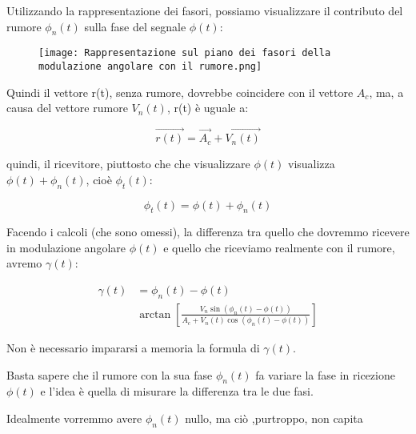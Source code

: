 \newpage 

Utilizzando la rappresentazione dei fasori, 
possiamo visualizzare il contributo del rumore $\phi_n (t)$ sulla fase del segnale $\phi (t)$: 

\begin{figure}[h]
    \centering
    \texttt{[image: Rappresentazione sul piano dei fasori della modulazione angolare con il rumore.png]}
\end{figure} 

Quindi il vettore r(t), senza rumore, dovrebbe coincidere con il vettore $A_c$, 
ma, a causa del vettore rumore $V_n (t)$, r(t) è uguale a: 

{
    \Large 
    \begin{equation}
        \overrightarrow{r(t)} = \overrightarrow{A_c} + \overrightarrow{V_n (t)}
    \end{equation}
}

quindi, il ricevitore, piuttosto che che visualizzare $\phi (t)$ visualizza $\phi (t) + \phi_n (t)$, cioè $\phi_t (t)$: 

{
    \Large 
    \begin{equation}
        \phi_t (t) = \phi (t) + \phi_n (t)
    \end{equation}
}

Facendo i calcoli (che sono omessi), la differenza tra quello che dovremmo ricevere in modulazione angolare $\phi (t)$ e quello che riceviamo realmente con il rumore, 
avremo $\gamma (t)$: 

{
    \Large 
    \begin{equation}
        \begin{split}
        \gamma (t) 
        &=
        \phi_n (t) - \phi (t) 
        \\
        &
        \arctan \left[\frac{V_n \sin(\phi_n (t) - \phi (t))}{A_c + V_n (t) \cos(\phi_n (t) - \phi (t))} \right] 
        \end{split} 
    \end{equation}
}

\begin{tcolorbox}
Non è necessario impararsi a memoria la formula  di $\gamma (t)$. \newline 

Basta sapere che il rumore con la sua fase $\phi_n (t)$ fa variare la fase in ricezione $\phi (t)$ e l'idea è quella di misurare la differenza tra le due fasi. \newline 

Idealmente vorremmo avere $\phi_n (t)$ nullo, ma ciò ,purtroppo, non capita
\end{tcolorbox}

